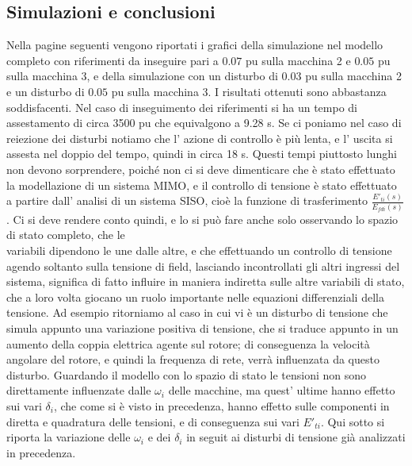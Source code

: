 \documentclass[Lau,noexaminfo]{sapthesis}
\begin{document}
	\subsection{Simulazioni e conclusioni}
	Nella pagine seguenti vengono riportati i grafici della simulazione nel modello completo con riferimenti da inseguire pari a $0.07$ pu sulla macchina 2 e $0.05$ pu sulla macchina 3, e della simulazione con un disturbo di $0.03$ pu sulla macchina 2 e un disturbo di $0.05$ pu sulla macchina 3. I risultati ottenuti sono abbastanza soddisfacenti. Nel caso di inseguimento dei riferimenti si ha un tempo di assestamento di circa 3500 pu che equivalgono a 9.28 s. Se ci poniamo nel caso di reiezione dei disturbi notiamo che l' azione di controllo è più lenta, e l' uscita si assesta nel doppio del tempo, quindi in circa 18 s. Questi tempi piuttosto lunghi non devono sorprendere, poiché non ci si deve dimenticare che è stato effettuato la modellazione di un sistema MIMO, e il controllo di tensione è stato effettuato a partire dall' analisi di un sistema SISO, cioè la funzione di trasferimento $\frac{E'_{ti}(s)}{E_{fdi}(s)}$. Ci si deve rendere conto quindi, e lo si può fare anche solo osservando lo spazio di stato completo, che le\\ variabili dipendono le une dalle altre, e che effettuando un controllo di tensione agendo soltanto sulla tensione di field, lasciando incontrollati gli altri ingressi del sistema, significa di fatto influire in maniera indiretta sulle altre variabili di stato, che a loro volta giocano un ruolo importante nelle equazioni differenziali della tensione. Ad esempio ritorniamo al caso in cui vi è un disturbo di tensione che simula appunto una variazione positiva di tensione, che si traduce appunto in un aumento della coppia elettrica agente sul rotore; di conseguenza la velocità angolare del rotore, e quindi la frequenza di rete, verrà influenzata da questo disturbo. Guardando il modello con lo spazio di stato le tensioni non sono direttamente influenzate dalle $\omega_i$ delle macchine, ma quest' ultime hanno effetto sui vari $\delta_i$, che come si è visto in precedenza, hanno effetto sulle componenti in diretta e quadratura delle tensioni, e di conseguenza sui vari $E'_{ti}$. Qui sotto si riporta la variazione delle $\omega_i$ e dei $\delta_i$ in seguit ai disturbi di tensione già analizzati in precedenza.
\end{document}
